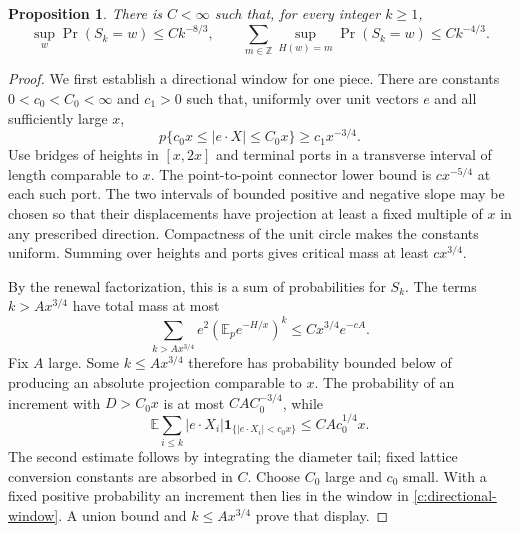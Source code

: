 \documentclass[11pt]{article}
\numberwithin{equation}{section}
\newtheorem{proposition}[theorem]{Proposition}
\theoremstyle{definition}\newtheorem{definition}[theorem]{Definition}
\theoremstyle{remark}\newtheorem{remark}[theorem]{Remark}
\begin{document}
\begin{proposition}\label{c:planar-atoms}
There is $C<\infty$ such that, for every integer $k\ge1$,
\begin{equation}\label{c:two-atom-bounds}
 \sup_w\Pr(S_k=w)\le Ck^{-8/3},\qquad
 \sum_{m\in\mathbb Z}\sup_{H(w)=m}\Pr(S_k=w)
 \le Ck^{-4/3}.
\end{equation}
\end{proposition}

\begin{proof}
We first establish a directional window for one piece.  There are constants
$0<c_0<C_0<\infty$ and $c_1>0$ such that, uniformly over unit vectors $e$
and all sufficiently large $x$,
\begin{equation}\label{c:directional-window}
 p\{c_0x\le |e\cdot X|\le C_0x\}\ge c_1x^{-3/4}.
\end{equation}
Use bridges of heights in $[x,2x]$ and terminal ports in a transverse
interval of length comparable to $x$.  The point-to-point connector lower
bound is $cx^{-5/4}$ at each such port.  The two intervals of bounded
positive and negative slope may be chosen so that their displacements
have projection at least a fixed multiple of $x$ in any prescribed
direction.  Compactness of the unit circle makes the constants uniform.
Summing over heights and ports gives critical mass at least $cx^{3/4}$.

By the renewal factorization, this is a sum of probabilities for $S_k$.
The terms $k>Ax^{3/4}$ have total mass at most
\[
 \sum_{k>Ax^{3/4}}e^2
   (\mathbb E_p e^{-H/x})^k
 \le Cx^{3/4}e^{-cA}.
\]
Fix $A$ large.  Some $k\le Ax^{3/4}$ therefore has probability bounded
below of producing an absolute projection comparable to $x$.
The probability of an increment with $D>C_0x$ is at most
$CA C_0^{-3/4}$, while
\[
 \mathbb E\sum_{i\le k}|e\cdot X_i|
       \mathbf1_{\{|e\cdot X_i|<c_0x\}}
 \le CA c_0^{1/4}x.
\]
The second estimate follows by integrating the diameter tail; fixed
lattice conversion constants are absorbed in $C$.  Choose $C_0$ large
and $c_0$ small.  With a fixed positive probability an increment then
lies in the window in \eqref{c:directional-window}.  A union bound and
$k\le Ax^{3/4}$ prove that display.


\end{proof}
\end{document}
